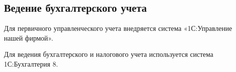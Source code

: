 \subsection{Ведение бухгалтерского учета}
Для первичного управленческого учета внедряется система «1С:Управление нашей фирмой».

Для ведения бухгалтерского и налогового учета используется система 1С:Бухгалтерия 8.
